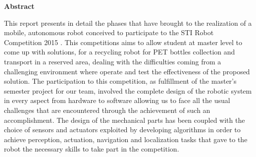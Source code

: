 %
%   
%







\clearpage
  \begin{deckblatt}
  \end{deckblatt}



\begin{center}
\bfseries
Abstract
\normalfont
\end{center}
This report presents in detail the phases that have brought to the realization of a mobile, autonomous robot conceived to participate to the STI Robot Competition 2015 . This competitions aims to allow student at master level to come up with solutions, for a recycling robot for PET bottles collection and transport in a reserved area, dealing with the difficulties coming from a challenging environment where operate and test the effectiveness of the proposed solution. The participation to this competition, as fulfillment of the master’s semester project for our team, involved the complete design of the robotic system in every aspect from hardware to software allowing us to face all the usual challenges that are encountered through the achievement of such an accomplishment. The design of the mechanical parts has been coupled with the choice of sensors and actuators exploited by developing algorithms in order to achieve perception, actuation, navigation and localization tasks that gave to the robot the necessary skills to take part in the competition.

\clearpage

\tableofcontents

\clearpage


